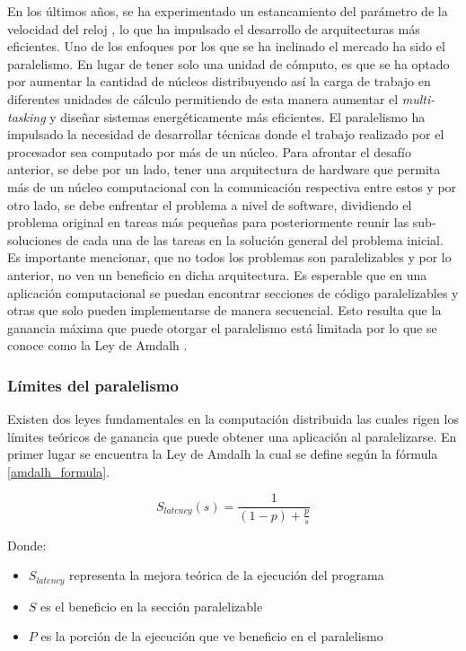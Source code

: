 En los últimos años, se ha experimentado un estancamiento del parámetro de la velocidad del reloj \cite{ross2008cpu}, lo que ha impulsado el desarrollo de arquitecturas más eficientes. Uno de los enfoques por los que se ha inclinado el mercado ha sido el paralelismo. En lugar de tener solo una unidad de cómputo, es que se ha optado por aumentar la cantidad de núcleos distribuyendo así la carga de trabajo en diferentes unidades de cálculo permitiendo de esta manera aumentar el \textit{multi-tasking} y diseñar sistemas energéticamente más eficientes. El paralelismo ha impulsado la necesidad de desarrollar técnicas donde el trabajo realizado por el procesador sea computado por más de un núcleo. Para afrontar el desafío anterior, se debe por un lado, tener una arquitectura de hardware que permita más de un núcleo computacional con la comunicación respectiva entre estos y por otro lado, se debe enfrentar el problema a nivel de software, dividiendo el problema original en tareas más pequeñas para posteriormente reunir las sub-soluciones de cada una de las tareas en la solución general del problema inicial. Es importante mencionar, que no todos los problemas son paralelizables y por lo anterior, no ven un beneficio en dicha arquitectura. Es esperable que en una aplicación computacional se puedan encontrar secciones de código paralelizables y otras que solo pueden implementarse de manera secuencial. Esto resulta que la ganancia máxima que puede otorgar el paralelismo está limitada por lo que se conoce como la Ley de Amdalh \cite{Amdahl:1967:VSP:1465482.1465560}.

\subsubsection{Límites del paralelismo}

Existen dos leyes fundamentales en la computación distribuida las cuales rigen los límites teóricos de ganancia que puede obtener una aplicación al paralelizarse. En primer lugar se encuentra la Ley de Amdalh la cual se define según la fórmula \ref{amdalh_formula}.

\begin{equation}
\label{amdalh_formula}
    S_{latency}\left ( s \right ) = \frac{1}{\left ( 1-p \right ) + \frac{p}{s}}
\end{equation}

Donde:
\begin{itemize}
    \item $S_{latency}$ representa la mejora teórica de la ejecución del programa
    \item $S$ es el beneficio en la sección paralelizable
    \item $P$ es la porción de la ejecución que ve beneficio en el paralelismo
\end{itemize}


